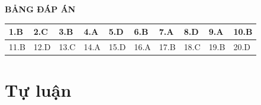 


\hideall
{
	\begin{center}
		\textbf{BẢNG ĐÁP ÁN}
	\end{center}
	\begin{center}
		\begin{tabular}{|m{2.8em}|m{2.8em}|m{2.8em}|m{2.8em}|m{2.8em}|m{2.8em}|m{2.8em}|m{2.8em}|m{2.8em}|m{2.8em}|}
			\hline
			1.B  & 2.C  & 3.B  & 4.A  & 5.D  & 6.B  & 7.A  & 8.D  & 9.A  & 10.B  \\
			\hline
			11.B  & 12.D  & 13.C  & 14.A  & 15.D  & 16.A  & 17.B  & 18.C  & 19.B  & 20.D  \\
			\hline
			
		\end{tabular}
	\end{center}
}
\section{Tự luận}
